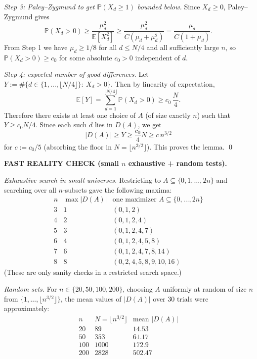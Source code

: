 \smallskip
\noindent
\emph{Step 3: Paley--Zygmund to get $\mathbb{P}(X_d\ge 1)$ bounded below.}
Since $X_d\ge 0$, Paley--Zygmund gives
\[
\mathbb{P}(X_d>0)\ge \frac{\mu_d^2}{\mathbb{E}[X_d^2]}\ge \frac{\mu_d^2}{C(\mu_d+\mu_d^2)}=\frac{\mu_d}{C(1+\mu_d)}.
\]
From Step 1 we have $\mu_d\ge 1/8$ for all $d\le N/4$ and all sufficiently large $n$, so $\mathbb{P}(X_d>0)\ge c_0$ for some absolute $c_0>0$ independent of $d$.

\smallskip
\noindent
\emph{Step 4: expected number of good differences.}
Let $Y:=\#\{d\in\{1,\dots,\lfloor N/4\rfloor\}:\ X_d>0\}$. Then by linearity of expectation,
\[
\mathbb{E}[Y]=\sum_{d=1}^{\lfloor N/4\rfloor} \mathbb{P}(X_d>0)\ge c_0\,\frac{N}{4}.
\]
Therefore there exists at least one choice of $A$ (of size exactly $n$) such that $Y\ge c_0 N/4$.
Since each such $d$ lies in $D(A)$, we get
\[
|D(A)|\ge Y\ge \frac{c_0}{4}N\ge c\,n^{3/2}
\]
for $c:=c_0/5$ (absorbing the floor in $N=\lfloor n^{3/2}\rfloor$). This proves the lemma. \qed

\smallskip
\noindent\textbf{FAST REALITY CHECK (small $n$ exhaustive + random tests).}

\smallskip
\noindent
\emph{Exhaustive search in small universes.} Restricting to $A\subseteq\{0,1,\dots,2n\}$ and searching over all $n$-subsets gave the following maxima:
\[
\begin{array}{r|r|l}
 n & \max |D(A)| & \text{one maximizer }A\subseteq\{0,\dots,2n\} \\\hline
 3&1&(0,1,2)\\
 4&2&(0,1,2,4)\\
 5&3&(0,1,2,4,7)\\
 6&4&(0,1,2,4,5,8)\\
 7&6&(0,1,2,4,7,8,14)\\
 8&8&(0,2,4,5,8,9,10,16)
\end{array}
\]
(These are only sanity checks in a restricted search space.)

\smallskip
\noindent
\emph{Random sets.} For $n\in\{20,50,100,200\}$, choosing $A$ uniformly at random of size $n$ from $\{1,\dots,\lfloor n^{3/2}\rfloor\}$, the mean values of $|D(A)|$ over $30$ trials were approximately:
\[
\begin{array}{r|r|r}
 n & N=\lfloor n^{3/2}\rfloor & \text{mean }|D(A)| \\\hline
 20&89&14.53\\
 50&353&61.17\\
 100&1000&172.9\\
 200&2828&502.47
\end{array}
\]

